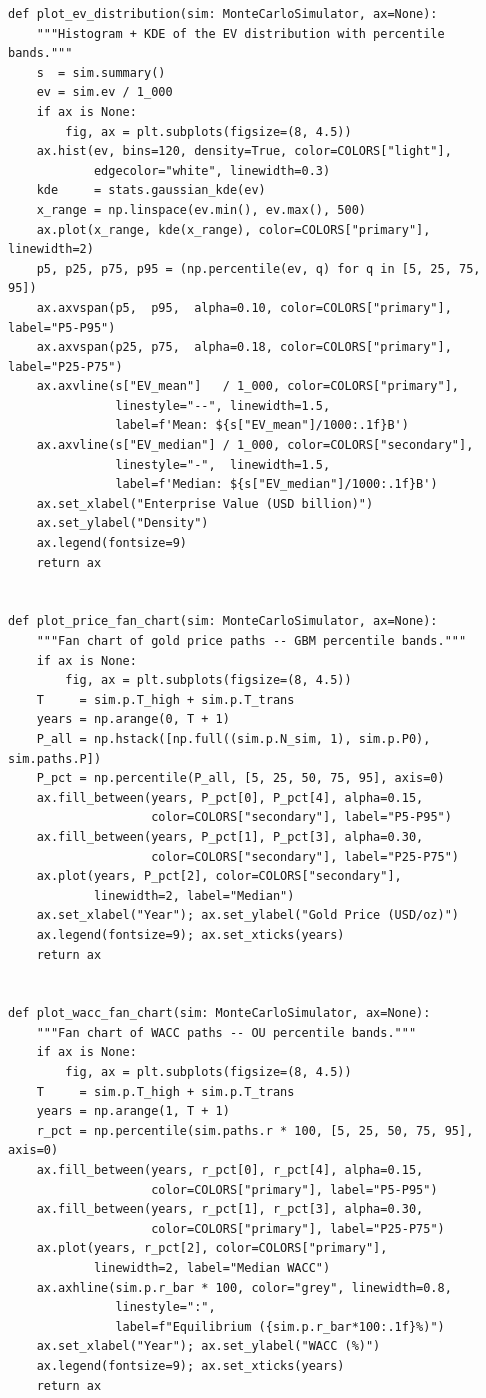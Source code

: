 \begin{lstlisting}[style=python, caption={Visualisation functions — EV distribution, fan charts, tornado}]
def plot_ev_distribution(sim: MonteCarloSimulator, ax=None):
    """Histogram + KDE of the EV distribution with percentile bands."""
    s  = sim.summary()
    ev = sim.ev / 1_000
    if ax is None:
        fig, ax = plt.subplots(figsize=(8, 4.5))
    ax.hist(ev, bins=120, density=True, color=COLORS["light"],
            edgecolor="white", linewidth=0.3)
    kde     = stats.gaussian_kde(ev)
    x_range = np.linspace(ev.min(), ev.max(), 500)
    ax.plot(x_range, kde(x_range), color=COLORS["primary"], linewidth=2)
    p5, p25, p75, p95 = (np.percentile(ev, q) for q in [5, 25, 75, 95])
    ax.axvspan(p5,  p95,  alpha=0.10, color=COLORS["primary"], label="P5-P95")
    ax.axvspan(p25, p75,  alpha=0.18, color=COLORS["primary"], label="P25-P75")
    ax.axvline(s["EV_mean"]   / 1_000, color=COLORS["primary"],
               linestyle="--", linewidth=1.5,
               label=f'Mean: ${s["EV_mean"]/1000:.1f}B')
    ax.axvline(s["EV_median"] / 1_000, color=COLORS["secondary"],
               linestyle="-",  linewidth=1.5,
               label=f'Median: ${s["EV_median"]/1000:.1f}B')
    ax.set_xlabel("Enterprise Value (USD billion)")
    ax.set_ylabel("Density")
    ax.legend(fontsize=9)
    return ax


def plot_price_fan_chart(sim: MonteCarloSimulator, ax=None):
    """Fan chart of gold price paths -- GBM percentile bands."""
    if ax is None:
        fig, ax = plt.subplots(figsize=(8, 4.5))
    T     = sim.p.T_high + sim.p.T_trans
    years = np.arange(0, T + 1)
    P_all = np.hstack([np.full((sim.p.N_sim, 1), sim.p.P0), sim.paths.P])
    P_pct = np.percentile(P_all, [5, 25, 50, 75, 95], axis=0)
    ax.fill_between(years, P_pct[0], P_pct[4], alpha=0.15,
                    color=COLORS["secondary"], label="P5-P95")
    ax.fill_between(years, P_pct[1], P_pct[3], alpha=0.30,
                    color=COLORS["secondary"], label="P25-P75")
    ax.plot(years, P_pct[2], color=COLORS["secondary"],
            linewidth=2, label="Median")
    ax.set_xlabel("Year"); ax.set_ylabel("Gold Price (USD/oz)")
    ax.legend(fontsize=9); ax.set_xticks(years)
    return ax


def plot_wacc_fan_chart(sim: MonteCarloSimulator, ax=None):
    """Fan chart of WACC paths -- OU percentile bands."""
    if ax is None:
        fig, ax = plt.subplots(figsize=(8, 4.5))
    T     = sim.p.T_high + sim.p.T_trans
    years = np.arange(1, T + 1)
    r_pct = np.percentile(sim.paths.r * 100, [5, 25, 50, 75, 95], axis=0)
    ax.fill_between(years, r_pct[0], r_pct[4], alpha=0.15,
                    color=COLORS["primary"], label="P5-P95")
    ax.fill_between(years, r_pct[1], r_pct[3], alpha=0.30,
                    color=COLORS["primary"], label="P25-P75")
    ax.plot(years, r_pct[2], color=COLORS["primary"],
            linewidth=2, label="Median WACC")
    ax.axhline(sim.p.r_bar * 100, color="grey", linewidth=0.8,
               linestyle=":",
               label=f"Equilibrium ({sim.p.r_bar*100:.1f}%)")
    ax.set_xlabel("Year"); ax.set_ylabel("WACC (%)")
    ax.legend(fontsize=9); ax.set_xticks(years)
    return ax



\end{lstlisting}
